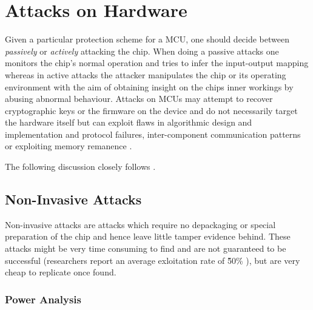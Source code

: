 \section{Attacks on Hardware}
\label{sec:curr_attacks}

Given a particular protection scheme for a MCU, one should decide between \emph{passively} or \emph{actively} attacking the chip. When doing a passive attacks one monitors the chip's normal operation and tries to infer the input-output mapping whereas in active attacks the attacker manipulates the chip or its operating environment with the aim of obtaining insight on the chips inner workings by abusing abnormal behaviour. Attacks on MCUs may attempt to recover cryptographic keys or the firmware on the device and do not necessarily target the hardware itself but can exploit flaws in algorithmic design and implementation and protocol failures, inter-component communication patterns \citep{anderson:cautionary_note} \citep{kocher:DPA} or exploiting memory remanence \citep{sergei:thesis} \citep{gutman:memory_remanence}.

The following discussion closely follows \citep{sergei:thesis}.

	\subsection{Non-Invasive Attacks}
	Non-invasive attacks are attacks which require no depackaging or special preparation of the chip and hence leave little tamper evidence behind. These attacks might be very time consuming to find and are not guaranteed to be successful (researchers report an average exloitation rate of \~50\% \citep{sergei:thesis} \citep{glitches_paper}), but are very cheap to replicate once found.
	
	\subsubsection{Power Analysis}	
	\label{subsubsec:power_analysis}

